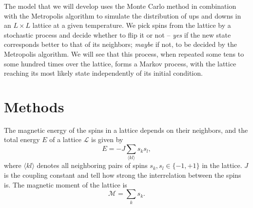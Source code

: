 \documentclass[]{article}
\begin{document}
The model that we will develop uses the Monte Carlo method in combination with the Metropolis algorithm to simulate the distribution of ups and downs in an $L \times L$ lattice at a given temperature. We pick spins from the lattice by a stochastic process and decide whether to flip it or not -- \textit{yes} if the new state corresponds better to that of its neighbors; \textit{maybe} if not, to be decided by the Metropolis algorithm. We will see that this process, when repeated some tens to some hundred times over the lattice, forms a Markov process, with the lattice reaching its most likely state independently of its initial condition.



\section{Methods} \label{methods}


The magnetic energy of the spins in a lattice depends on their neighbors, and the total energy $E$ of a lattice $\mathcal{L}$ is given by
\begin{equation} \label{eq:e-sum}
	E = -J \sum_{\langle kl \rangle} s_k s_l,
\end{equation}
where $\langle kl \rangle$ denotes all neighboring pairs of spins $s_k, s_l \in \{ -1, +1\}$ in the lattice. $J$ is the coupling constant and tell how strong the interrelation between the spins is. The magnetic moment of the lattice is
\begin{equation} \label{eq:m-sum}
	\mathcal{M} = \sum_{k} s_k.
\end{equation}
\end{document}
